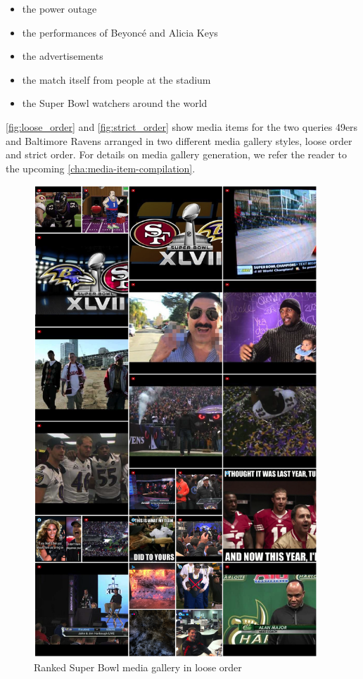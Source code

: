 \begin{itemize}
  \itemsep0em
  \item the power outage
  \item the performances of Beyoncé and Alicia Keys
  \item the advertisements
  \item the match itself from people at the stadium
  \item the Super Bowl watchers around the world 
\end{itemize}

\autoref{fig:loose_order} and \autoref{fig:strict_order} show media items
for the two queries 49ers and Baltimore Ravens arranged
in two different media gallery styles, loose order and strict order.
For details on media gallery generation, we refer the reader to the upcoming
\autoref{cha:media-item-compilation}.

\begin{figure}[!ht]
  \centering
  \includegraphics[width=0.95\textwidth,height=0.9\textheight,keepaspectratio]{loose_order.png}
  \caption[Ranked Super Bowl media gallery in loose order]
  {Ranked Super Bowl media gallery in loose order}
  \label{fig:loose_order}
\end{figure}

